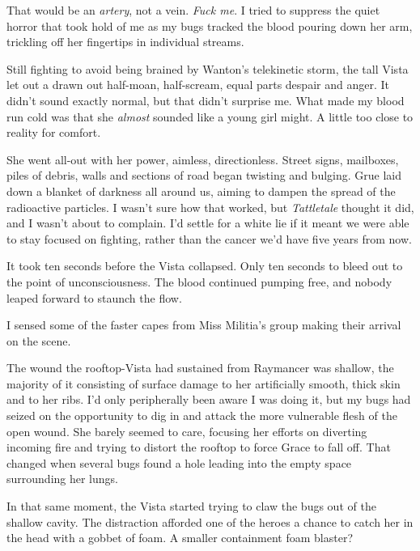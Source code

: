 That would be an \emph{artery}, not a vein.  \emph{Fuck me}.  I tried to suppress the quiet horror that took hold of me as my bugs tracked the blood pouring down her arm, trickling off her fingertips in individual streams.



Still fighting to avoid being brained by Wanton's telekinetic storm, the tall Vista let out a drawn out half-moan, half-scream, equal parts despair and anger.  It didn't sound exactly normal, but that didn't surprise me.  What made my blood run cold was that she\emph{ almost} sounded like a young girl might.  A little too close to reality for comfort.



She went all-out with her power, aimless, directionless.  Street signs, mailboxes, piles of debris, walls and sections of road began twisting and bulging.  Grue laid down a blanket of darkness all around us, aiming to dampen the spread of the radioactive particles.  I wasn't sure how that worked, but \emph{Tattletale} thought it did, and I wasn't about to complain.  I'd settle for a white lie if it meant we were able to stay focused on fighting, rather than the cancer we'd have five years from now.



It took ten seconds before the Vista collapsed.  Only ten seconds to bleed out to the point of unconsciousness.  The blood continued pumping free, and nobody leaped forward to staunch the flow.



I sensed some of the faster capes from Miss Militia's group making their arrival on the scene.



The wound the rooftop-Vista had sustained from Raymancer was shallow, the majority of it consisting of surface damage to her artificially smooth, thick skin and to her ribs.  I'd only peripherally been aware I was doing it, but my bugs had seized on the opportunity to dig in and attack the more vulnerable flesh of the open wound. She barely seemed to care, focusing her efforts on diverting incoming fire and trying to distort the rooftop to force Grace to fall off.  That changed when several bugs found a hole leading into the empty space surrounding her lungs.



In that same moment, the Vista started trying to claw the bugs out of the shallow cavity.  The distraction afforded one of the heroes a chance to catch her in the head with a gobbet of foam.  A smaller containment foam blaster?



